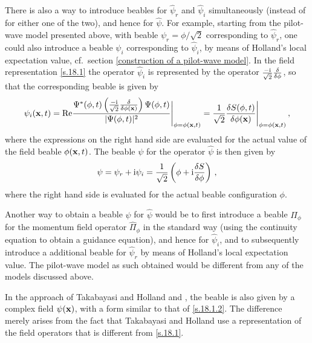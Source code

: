 \documentclass[12pt]{article}
\def\ii{\textrm i}
\begin{document}
There is also a way to introduce beables for ${\widehat \psi}_r$ and ${\widehat \psi}_i$ simultaneously (instead of for either one of the two), and hence for ${\widehat \psi}$. For example, starting from the pilot-wave model presented above, with beable $\psi_r=\phi/\sqrt{2}$ corresponding to ${\widehat \psi}_r$, one could also introduce a beable $\psi_i$ corresponding to ${\widehat \psi}_i$, by means of Holland's local expectation value, cf.\ section \ref{construction of a pilot-wave model}. In the field representation \eqref{s.18.1} the operator ${\widehat \psi}_i$ is represented by the operator $\frac{-\ii}{\sqrt{2}} \frac{\delta}{\delta \phi}$, so that the corresponding beable is given by
\begin{equation}
\psi_i({\bf x},t) = {\textrm{Re}} \frac{\Psi^*(\phi,t) \left( \frac{-\ii}{\sqrt{2}} \frac{\delta}{\delta \phi({\bf x})} \right) \Psi(\phi,t)}{|\Psi(\phi,t)|^2} \Bigg|_{\phi=\phi({\bf x},t)} = \frac{1}{\sqrt{2}} \frac{\delta S(\phi,t)}{\delta \phi({\bf x})}\Bigg|_{\phi=\phi({\bf x},t)}\,,
\label{s.18.1.1}
\end{equation}
where the expressions on the right hand side are evaluated for the actual value of the field beable $\phi({\bf x},t)$. The beable $\psi$ for the operator $\widehat \psi$ is then given by 
\begin{equation}
\psi = \psi_r + \ii \psi_i =  \frac{1}{\sqrt{2}} \left(\phi + \ii \frac{\delta S}{\delta \phi}  \right) \,,
\label{s.18.1.2}
\end{equation}
where the right hand side is evaluated for the actual beable configuration $\phi$.

Another way to obtain a beable $\psi$ for ${\widehat \psi}$ would be to first introduce a beable $\Pi_\phi$ for the momentum field operator $\widehat{\Pi}_{\phi}$ in the standard way (using the continuity equation to obtain a guidance equation), and hence for ${\widehat \psi}_i$, and to subsequently introduce a additional beable for ${\widehat \psi}_r$ by means of Holland's local expectation value. The pilot-wave model as such obtained would be different from any of the models discussed above.

In the approach of Takabayasi \cite{takabayasi52} and Holland \cite{holland881} and \cite[pp.\ 449-451]{holland93b}, the beable is also given by a complex field $\psi({\bf x})$, with a form similar to that of \eqref{s.18.1.2}. The difference merely arises from the fact that Takabayasi and Holland use a representation of the field operators that is different from \eqref{s.18.1}.
\end{document}
